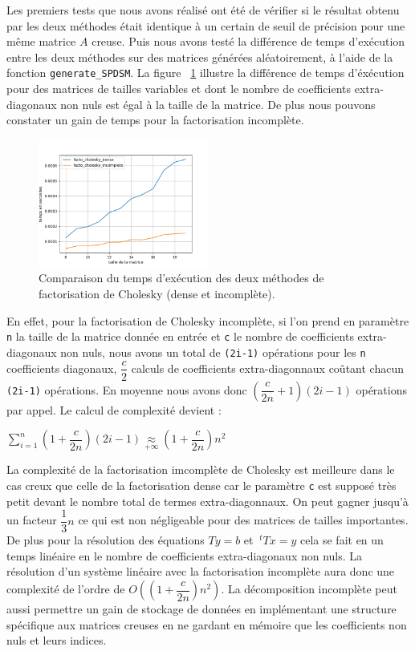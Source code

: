 \documentclass{article}
\begin{document}
Les premiers tests que nous avons réalisé ont été de vérifier si le résultat obtenu par les deux méthodes était identique à un certain de seuil de précision pour une même matrice $A$ creuse. Puis nous avons testé la différence de temps d'exécution entre les deux méthodes sur des matrices générées aléatoirement, à l'aide de la fonction \texttt{generate\_SPDSM}. La figure ~\ref{fig:comparaison_facto} illustre la différence de temps d'éxécution pour des matrices de tailles variables et dont le nombre de coefficients extra-diagonaux non nuls est égal à la taille de la matrice. De plus nous pouvons constater un gain de temps pour la factorisation incomplète.

\begin{figure}[htbp]
  \centering
  \includegraphics[width=0.5\textwidth]{images/Graphe.png}
  \caption{Comparaison du temps d'exécution des deux méthodes de factorisation de Cholesky (dense et incomplète).}
  \label{fig:comparaison_facto}
\end{figure}%

En effet, pour la factorisation de Cholesky incomplète, si l'on prend en paramètre \texttt{n} la taille de la matrice donnée en entrée et \texttt{c} le nombre de coefficients extra-diagonaux non nuls, nous avons un total de \texttt{(2i-1)} opérations pour les \texttt{n} coefficients diagonaux, $\dfrac{c}{2}$ calculs de coefficients extra-diagonnaux coûtant chacun \texttt{(2i-1)} opérations. En moyenne nous avons donc $(\dfrac{c}{2n}+1)(2i-1)$ opérations par appel. Le calcul de complexité devient :
\begin{center}
  $\displaystyle{\sum\limits^{n}_{i=1}(1+\dfrac{c}{2n})(2i-1)\underset{+\infty}{\approx}(1+\dfrac{c}{2n})n^{2}}$
\end{center}

La complexité de la factorisation imcomplète de Cholesky est meilleure dans le cas creux que celle de la factorisation dense car le paramètre \texttt{c} est supposé très petit devant le nombre total de termes extra-diagonnaux. On peut gagner jusqu'à un facteur $\dfrac{1}{3}n$ ce qui est non négligeable pour des matrices de tailles importantes. De plus pour la résolution des équations $Ty=b$ et $~^{t}Tx=y$ cela se fait en un temps linéaire en le nombre de coefficients extra-diagonaux non nuls. La résolution d'un système linéaire avec la factorisation incomplète aura donc une complexité de l'ordre de $O((1+\dfrac{c}{2n})n^{2})$. La décomposition incomplète peut aussi permettre un gain de stockage de données en implémentant une structure spécifique aux matrices creuses en ne gardant en mémoire que les coefficients non nuls et leurs indices.\\
\end{document}
